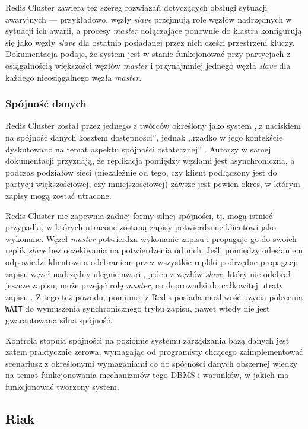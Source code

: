 Redis Cluster zawiera też szereg rozwiązań dotyczących obsługi sytuacji awaryjnych --- przykładowo, węzły \textit{slave} przejmują role węzłów nadrzędnych w sytuacji ich awarii, a procesy \textit{master} dołączające ponownie do klastra konfigurują się jako węzły \textit{slave} dla ostatnio posiadanej przez nich części przestrzeni kluczy. Dokumentacja podaje, że system jest w stanie funkcjonować przy partycjach z osiągalnością większości węzłów \textit{master} i przynajmniej jednego węzła \textit{slave} dla każdego nieosiągalnego węzła \textit{master}.

\subsubsection*{Spójność danych}

Redis Cluster został przez jednego z twórców określony jako system ,,z naciskiem na spójność danych kosztem dostępności'', jednak ,,rzadko w jego kontekście dyskutowano na temat aspektu spójności ostatecznej'' \cite{antirez}.  Autorzy w samej dokumentacji przyznają, że replikacja pomiędzy węzłami jest asynchroniczna, a podczas podziałów sieci (niezależnie od tego, czy klient podłączony jest do partycji większościowej, czy mniejszościowej) zawsze jest pewien okres, w którym zapisy mogą zostać utracone.

Redis Cluster nie zapewnia żadnej formy silnej spójności, tj. mogą istnieć przypadki, w których utracone zostaną zapisy potwierdzone klientowi jako wykonane. Węzeł \textit{master} potwierdza wykonanie zapisu i propaguje go do swoich replik \textit{slave} bez oczekiwania na potwierdzenia od nich. Jeśli pomiędzy odesłaniem odpowiedzi klientowi a odebraniem przez wszystkie repliki podrzędne propagacji zapisu węzeł nadrzędny ulegnie awarii, jeden z węzłów \textit{slave}, który nie odebrał jeszcze zapisu, może przejąć rolę \textit{master}, co doprowadzi do całkowitej utraty zapisu \cite{redisclustertut}. Z tego też powodu, pomiimo iż Redis posiada możliwość użycia polecenia \texttt{WAIT} do wymuszenia synchronicznego trybu zapisu, nawet wtedy nie jest gwarantowana silna spójność.

Kontrola stopnia spójności na poziomie systemu zarządzania bazą danych jest zatem praktycznie zerowa, wymagając od programisty chcącego zaimplementować scenariusz z określonymi wymaganiami co do spójności danych obszernej wiedzy na temat funkcjonowania mechanizmów tego DBMS i warunków, w jakich ma funkcjonować tworzony system.

\subsection{Riak}

